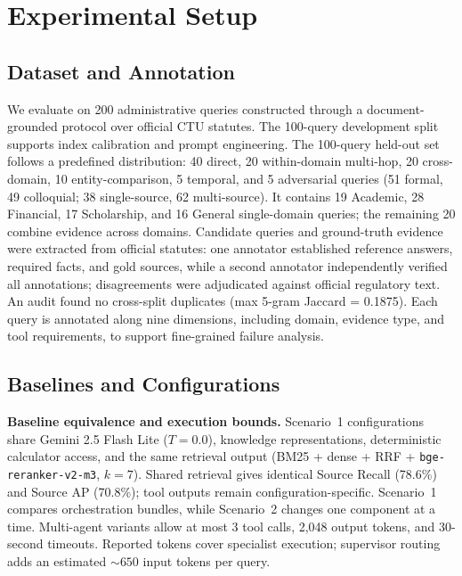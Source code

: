 \section{Experimental Setup}
\label{sec:exp_setup}

\subsection{Dataset and Annotation}
\label{sec:dataset}

We evaluate \system{} on 200 administrative queries constructed through a document-grounded protocol over official CTU statutes. The 100-query development split supports index calibration and prompt engineering. The 100-query held-out set follows a predefined distribution: 40 direct, 20 within-domain multi-hop, 20 cross-domain, 10 entity-comparison, 5 temporal, and 5 adversarial queries (51 formal, 49 colloquial; 38 single-source, 62 multi-source). It contains 19 Academic, 28 Financial, 17 Scholarship, and 16 General single-domain queries; the remaining 20 combine evidence across domains. Candidate queries and ground-truth evidence were extracted from official statutes: one annotator established reference answers, required facts, and gold sources, while a second annotator independently verified all annotations; disagreements were adjudicated against official regulatory text. An audit found no cross-split duplicates (max 5-gram Jaccard = 0.1875). Each query is annotated along nine dimensions, including domain, evidence type, and tool requirements, to support fine-grained failure analysis.

\subsection{Baselines and Configurations}
\label{sec:baselines}

\textbf{Baseline equivalence and execution bounds.} Scenario~1 configurations share Gemini 2.5 Flash Lite ($T{=}0.0$), knowledge representations, deterministic calculator access, and the same retrieval output (BM25 + dense + RRF + \texttt{bge-\allowbreak reranker-\allowbreak v2-\allowbreak m3}, $k{=}7$). Shared retrieval gives identical Source Recall (78.6\%) and Source AP (70.8\%); tool outputs remain configuration-specific. Scenario~1 compares orchestration bundles, while Scenario~2 changes one component at a time. Multi-agent variants allow at most 3 tool calls, 2{,}048 output tokens, and 30-second timeouts. Reported tokens cover specialist execution; supervisor routing adds an estimated ${\sim}650$ input tokens per query.

